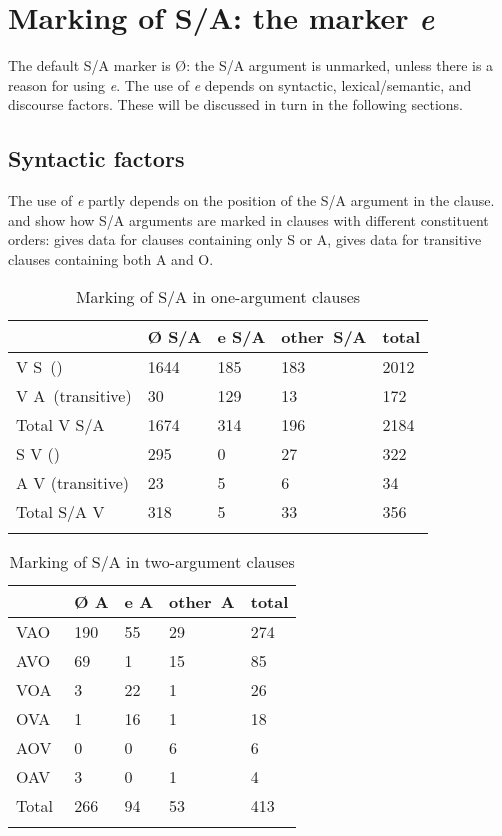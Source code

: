 \section{Marking of S/A: the  marker \textit{e}}\label{sec:8.3}

The default S/A marker is Ø: the S/A argument is unmarked, unless there is a reason for using \textit{e}. The use of \textit{e} depends on syntactic, lexical/semantic, and discourse factors. These will be discussed in turn in the following sections.

\subsection[Syntactic factors]{Syntactic factors}\label{sec:8.3.1.1}

The use of \textit{e} partly depends on the position of the S/A argument in the clause.  and  show how S/A arguments are marked in clauses with different constituent orders:  gives data for clauses containing only S or A,  gives data for transitive clauses containing both A and O.

\begin{table}
\begin{tabularx}{\textwidth}{XR{15mm}R{15mm}R{17mm}R{15mm}}
\lsptoprule
 &  { Ø S/A}&  { e S/A}&  { other~S/A}&  { total}\\
\midrule
{V S}~() &  1644&  185&  183&  2012\\
{V A}~(transitive) &  30&  129&  13&  172\\
\midrule
{ Total V S/A} &  1674&  314 &  196 &  2184 \\
\tablevspace
{S V} () &  295&  0&  27&  322\\
{A V} (transitive) &  23&  5&  6&  34\\
\midrule
{ Total S/A V} &  318&  5 & 33 &  356\\
\lspbottomrule
\end{tabularx}
\caption{Marking of S/A in one-argument clauses}
\label{tab:57}
\end{table}

\begin{table}
\begin{tabularx}{.75\textwidth}{XR{12mm}R{12mm}R{15mm}R{12mm}}
\lsptoprule
 &  { Ø A}&  { e A}&  { other~A}&  { total}\\
\midrule
{ VAO} &  190&  55&  29&  274\\
{ AVO} &  69&  1&  15&  85\\
{ VOA} &  3&  22&  1&  26\\
{ OVA~} &  1&  16&  1&  18\\
{ AOV} &  0&  0&  6&  6\\
{ OAV} &  3&  0&  1&  4\\
\midrule
{ Total} &  266&  94&  53&  413\\
\lspbottomrule
\end{tabularx}
\caption{Marking of S/A in two-argument clauses}
\label{tab:58}
\end{table}

